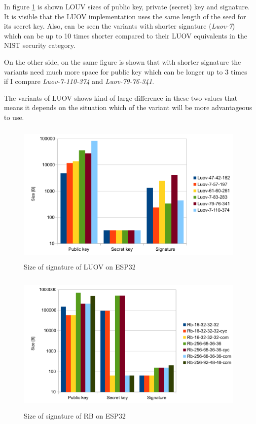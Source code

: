 \documentclass[thesis=M,english]{FITthesis}[2019/12/23]
\begin{document}
\bigskip
\noindent
In figure \ref{sign-luov} is shown LOUV sizes of public key, private (secret) key and signature. It is visible that the LUOV implementation uses the same length of the seed for its secret key. Also, can be seen the variants with shorter signature (\textit{Luov-7}) which can be up to 10 times shorter compared to their LUOV equivalents in the NIST security category.

\bigskip
\noindent
On the other side, on the same figure is shown that with shorter signature the variants need much more space for public key which can be longer up to 3 times if I compare \textit{Luov-7-110-374} and \textit{Luov-79-76-341}.

\bigskip
\noindent
The variants of LUOV shows kind of large difference in these two values that means it depends on the situation which of the variant will be more advantageous to use.  

\begin{figure}[H]
\centering
\includegraphics[width=13cm,height=7cm]{images/sign-luov.pdf}
\caption{Size of signature of LUOV on ESP32}
\label{sign-luov}
\end{figure}

\begin{figure}[H]
\centering
\includegraphics[width=13cm,height=7cm]{images/sign-rb.pdf}
\caption{Size of signature of RB on ESP32}
\label{sign-rb}
\end{figure}
\end{document}
